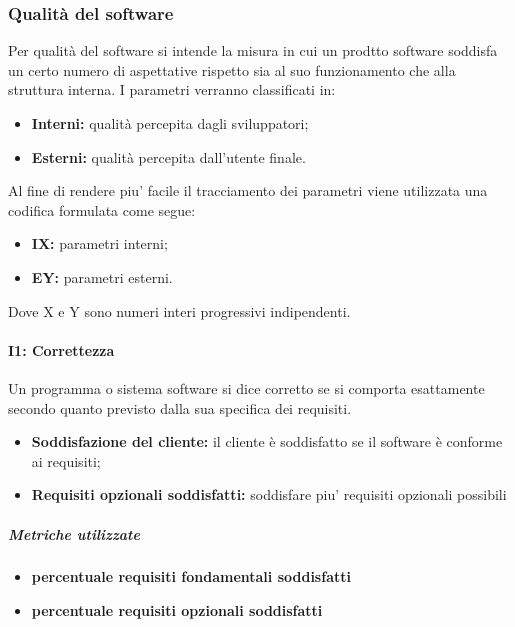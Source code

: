 \subsubsection{Qualità del software}
Per qualità del software si intende la misura in cui un prodtto software soddisfa un certo numero di aspettative rispetto sia al suo funzionamento che alla struttura interna. I parametri verranno classificati in:
\begin{itemize}
	\item{\textbf{Interni:} qualità percepita dagli sviluppatori;}
	\item{\textbf{Esterni:} qualità percepita dall'utente finale.}
\end{itemize}
Al fine di rendere piu' facile il tracciamento dei parametri viene utilizzata una codifica formulata come segue:
\begin{itemize}
	\item{\textbf{IX:} parametri interni;}
	\item{\textbf{EY:} parametri esterni.}
\end{itemize}
Dove X e Y sono numeri interi progressivi indipendenti.


\paragraph{\textbf{I1: Correttezza}} 
Un programma o sistema software si dice corretto se si comporta esattamente secondo quanto previsto dalla sua specifica dei requisiti.
\begin{itemize}
	\item \textbf{Soddisfazione del cliente:} il cliente è soddisfatto se il software è conforme ai requisiti;
	\item \textbf{Requisiti opzionali soddisfatti:} soddisfare piu' requisiti opzionali possibili
\end{itemize}
\subparagraph{Metriche utilizzate}
\begin{itemize}
	\item \textbf{percentuale requisiti fondamentali soddisfatti}
	\item \textbf{percentuale requisiti opzionali soddisfatti}
\end{itemize}
\begin{table}[!htpb]
	\centering
	\renewcommand{\arraystretch}{2} 
	\caption{Metriche utilizzate per la Correttezza}
\end{table}
